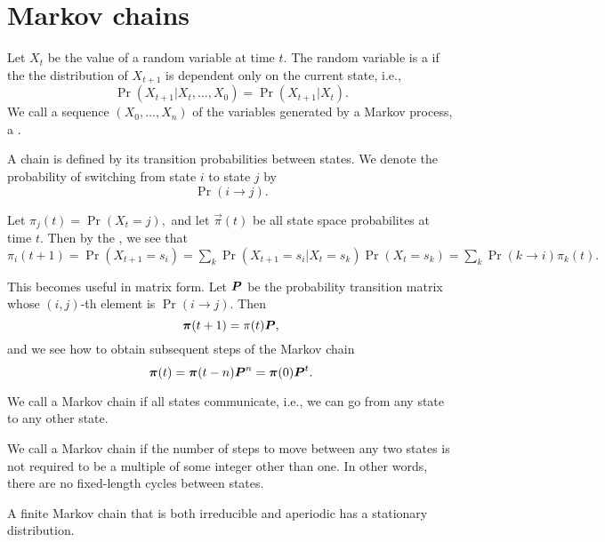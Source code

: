 \documentclass[thesis.tex]{subfiles}
\begin{document}
\section{Markov chains}

Let \(X_t\) be the value of a random variable at time \(t\). The random variable is a  if the the distribution of \(X_{t+1}\) is dependent only on the current state, i.e., \[
	\Pr(X_{t+1} | X_t, \ldots, X_0)	= \Pr(X_{t+1} | X_t).
\] We call a sequence \((X_0, \ldots, X_n)\) of the variables generated by a Markov process, a .

A chain is defined by its transition probabilities between states. We denote the probability of switching from state \(i\) to state \(j\) by \[
	\Pr(i \to j).
\]

Let \(\pi_j(t) = \Pr(X_t = j),\) and let \(\vec{\pi}(t)\) be all state space probabilites at time \(t\). Then by the , we see that \(
	\pi_i(t + 1) = \Pr(X_{t+1} = s_i)
	= \sum_k \Pr(X_{t+1} = s_i | X_t = s_k)\Pr(X_t = s_k)
	= \sum_k \Pr(k \to i)\pi_k(t).
\)

This becomes useful in matrix form. Let \(\boldsymbol{P}\) be the probability transition matrix whose \((i, j)\)-th element is \(\Pr(i \to j)\). Then \[
	\boldsymbol{\pi} (t + 1) = \pi(t) \boldsymbol{P},
\] and we see how to obtain subsequent steps of the Markov chain \[
	\boldsymbol{\pi}(t) = \boldsymbol{\pi}(t - n)\boldsymbol{P}^n = \boldsymbol{\pi}(0)\boldsymbol{P}^t.
\]

We call a Markov chain  if all states communicate, i.e., we can go from any state to any other state.

We call a Markov chain  if the number of steps to move between any two states is not required to be a multiple of some integer other than one. In other words, there are no fixed-length cycles between states.

A finite Markov chain that is both irreducible and aperiodic has a stationary distribution.

\bigskip
\end{document}
